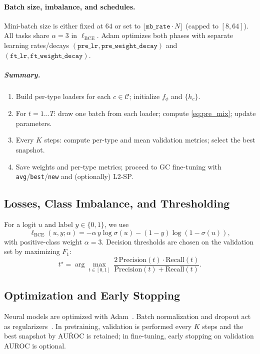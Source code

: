 \documentclass[journal,article,submit,pdftex,moreauthors]{Definitions/mdpi}
\begin{document}
\paragraph{Batch size, imbalance, and schedules.}
Mini-batch size is either fixed at $64$ or set to $\lfloor \texttt{mb\_rate}\cdot N\rfloor$ (capped to $[8,64]$). All tasks share $\alpha{=}3$ in $\ell_{\mathrm{BCE}}$. Adam optimizes both phases with separate learning rates/decays $(\texttt{pre\_lr},\texttt{pre\_weight\_decay})$ and $(\texttt{ft\_lr},\texttt{ft\_weight\_decay})$.

\subparagraph{Summary.}
\begin{enumerate}[topsep=0pt,itemsep=1pt,leftmargin=12pt]
\item Build per-type loaders for each $c\in\mathcal{C}$; initialize $f_\phi$ and $\{h_c\}$.
\item For $t=1\ldots T$: draw one batch from each loader; compute \eqref{eq:pre_mix}; update parameters.
\item Every $K$ steps: compute per-type and mean validation metrics; select the best snapshot.
\item Save weights and per-type metrics; proceed to GC fine-tuning with \texttt{avg}/\texttt{best}/\texttt{new} and (optionally) L2-SP.
\end{enumerate}

\subsection{Losses, Class Imbalance, and Thresholding}
For a logit $u$ and label $y\in\{0,1\}$, we use
\begin{equation}
\ell_{\mathrm{BCE}}(u,y;\alpha)=-\alpha\,y\log\sigma(u)-(1-y)\log(1-\sigma(u)),
\end{equation}
with positive-class weight $\alpha{=}3$. Decision thresholds are chosen on the validation set by maximizing $F_1$:
\begin{equation}
t^\star=\arg\max_{t\in[0,1]}\ \frac{2\,\mathrm{Precision}(t)\cdot\mathrm{Recall}(t)}{\mathrm{Precision}(t)+\mathrm{Recall}(t)}.
\end{equation}

\subsection{Optimization and Early Stopping}
Neural models are optimized with Adam~\citep{Kingma2015_Adam}. Batch normalization and dropout act as regularizers~\citep{Ioffe2015_BN,Srivastava2014_Dropout}. In pretraining, validation is performed every $K$ steps and the best snapshot by $\overline{\mathrm{AUROC}}$ is retained; in fine-tuning, early stopping on validation AUROC is optional.
\end{document}
